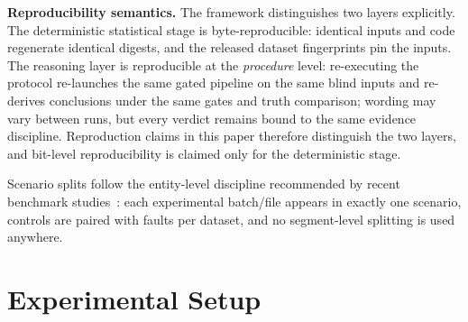 \documentclass[preprint,10pt]{elsarticle}
\begin{document}
\textbf{Reproducibility semantics.} The framework distinguishes two layers explicitly. The deterministic statistical stage is byte-reproducible: identical inputs and code regenerate identical digests, and the released dataset fingerprints pin the inputs. The reasoning layer is reproducible at the \emph{procedure} level: re-executing the protocol re-launches the same gated pipeline on the same blind inputs and re-derives conclusions under the same gates and truth comparison; wording may vary between runs, but every verdict remains bound to the same evidence discipline. Reproduction claims in this paper therefore distinguish the two layers, and bit-level reproducibility is claimed only for the deterministic stage.

Scenario splits follow the entity-level discipline recommended by recent benchmark studies~\cite{vieira2026towards,hendriks2022towards}: each experimental batch/file appears in exactly one scenario, controls are paired with faults per dataset, and no segment-level splitting is used anywhere.

\section{Experimental Setup}
\label{sec:setup}
\end{document}
